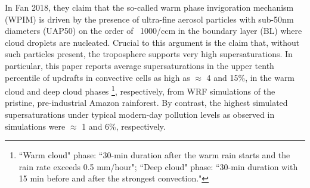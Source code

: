\documentclass{article}
\begin{document}
In Fan 2018, they claim that the so-called warm phase invigoration mechanism (WPIM) is driven by the presence of ultra-fine aerosol particles with sub-50nm diameters (UAP50) on the order of ~1000/ccm in the boundary layer (BL) where cloud droplets are nucleated. Crucial to this argument is the claim that, without such particles present, the troposphere supports very high supersaturations. In particular, this paper reports average supersaturations in the upper tenth percentile of updrafts in convective cells as high as $\approx$ 4 and 15\%, in the warm cloud and deep cloud phases \footnote{``Warm cloud" phase: ``30-min duration after the warm rain starts and the rain rate exceeds 0.5 mm/hour"; ``Deep cloud" phase: ``30-min duration with 15 min before and after the strongest convection."}, respectively, from WRF simulations of the pristine, pre-industrial Amazon rainforest. By contrast, the highest simulated supersaturations under typical modern-day pollution levels as observed in simulations were $\approx$ 1 and 6\%, respectively. 
\end{document}
